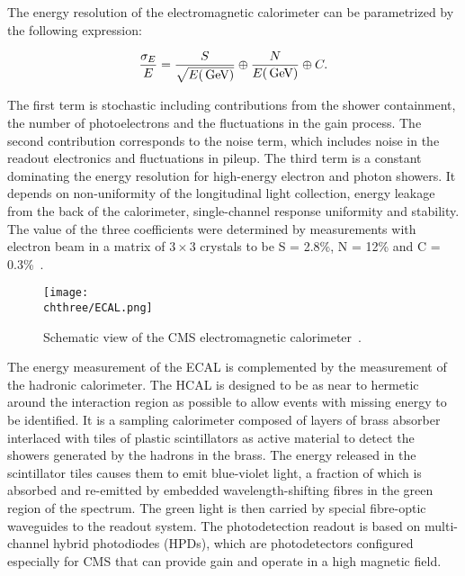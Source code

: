The energy resolution of the electromagnetic calorimeter can be parametrized by the following expression:

\begin{equation}
\frac{\sigma_E}{E} = \frac{S}{\sqrt{E(\,\text{Ge\hspace{-.08em}V})}} \oplus \frac{N}{E(\,\text{Ge\hspace{-.08em}V})} \oplus C.
\end{equation}

The first term is stochastic including contributions from the shower containment, the number of photoelectrons and
the fluctuations in the gain process. The second contribution corresponds to the noise term, which includes noise in the readout electronics and fluctuations in pileup.
The third term is a constant dominating the energy resolution for high-energy electron and photon showers. It depends
on non-uniformity of the longitudinal light collection, energy leakage from the back of the calorimeter, single-channel response uniformity and stability. 
The value of the three coefficients were determined by measurements with electron beam in a matrix of $3\times3$ crystals to be S = 2.8\%, N = 12\% and C = 0.3\%~\cite{1748-0221-2-04-P04004}.\\

\begin{figure}[!htb]
 \begin{center}
  \texttt{[image: \\chthree/ECAL.png]}
 \end{center}
 \caption{Schematic view of the CMS electromagnetic calorimeter~\cite{Chatrchyan:2008zzk}.}
 \label{fig:ECALLayout}
\end{figure}

The energy measurement of the ECAL is complemented by the measurement of the hadronic calorimeter.
The HCAL is designed to be as near to hermetic around the interaction region as possible to allow events with missing energy to be identified.
It is a sampling calorimeter composed of layers of brass absorber interlaced with tiles of plastic scintillators as active material to detect the showers generated by the hadrons in the brass. The energy released in the scintillator tiles causes them to emit blue-violet light, a fraction of which is absorbed and re-emitted by embedded wavelength-shifting fibres in the green region of the spectrum. The green light is then carried by special fibre-optic waveguides to the readout system. The photodetection readout is based on multi-channel hybrid photodiodes (HPDs), which are photodetectors configured especially for CMS that can provide gain and operate in a high magnetic field.

